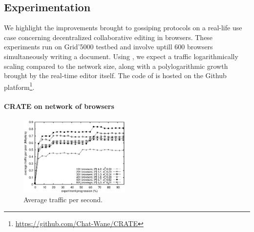 
\subsection{Experimentation}
\label{subsec:experiments2}

We highlight the improvements brought to gossiping protocols on a real-life use
case concerning decentralized collaborative editing in browsers.  These
experiments run on Grid'5000 testbed and involve uptill 600 browsers
simultaneously writing a document. Using \SPRAY, we expect a traffic
logarithmically scaling compared to the network size, along with a
polylogarithmic growth brought by the real-time editor itself. The code of
\CRATE is hosted on the Github
platform\footnote{\url{https://github.com/Chat-Wane/CRATE}}.

\vspace{-7pt}
\paragraph{CRATE on network of browsers}

\begin{figure}
  \centering
  \includegraphics[width=0.49\textwidth]{img/traffic.eps}
  \caption{\label{fig:traffic}Average traffic per second.}
\end{figure}

